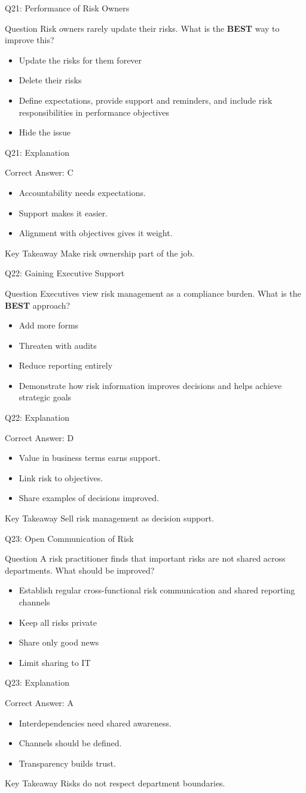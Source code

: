 \documentclass[aspectratio=169]{beamer}
\newcommand{\hq}[7]{%
	\begin{frame}{Q#1: #2}
		\begin{block}{Question}
			#3
		\end{block}
		\begin{itemize}
			#4
		\end{itemize}
	\end{frame}
	\begin{frame}{Q#1: Explanation}
		\begin{block}{Correct Answer: #5}
			\begin{itemize}
				#6
			\end{itemize}
		\end{block}
		\begin{alertblock}{Key Takeaway}
			#7
		\end{alertblock}
	\end{frame}
}
\begin{document}
	\hq{21}{Performance of Risk Owners}
	{Risk owners rarely update their risks. What is the \textbf{BEST} way to improve this?}
	{\item[\textbf{(A)}] Update the risks for them forever
		\item[\textbf{(B)}] Delete their risks
		\item[\textbf{(C)}] Define expectations, provide support and reminders, and include risk responsibilities in performance objectives
		\item[\textbf{(D)}] Hide the issue}
	{C}
	{\item Accountability needs expectations.
		\item Support makes it easier.
		\item Alignment with objectives gives it weight.}
	{Make risk ownership part of the job.}
	
	\hq{22}{Gaining Executive Support}
	{Executives view risk management as a compliance burden. What is the \textbf{BEST} approach?}
	{\item[\textbf{(A)}] Add more forms
		\item[\textbf{(B)}] Threaten with audits
		\item[\textbf{(C)}] Reduce reporting entirely
		\item[\textbf{(D)}] Demonstrate how risk information improves decisions and helps achieve strategic goals}
	{D}
	{\item Value in business terms earns support.
		\item Link risk to objectives.
		\item Share examples of decisions improved.}
	{Sell risk management as decision support.}
	
	\hq{23}{Open Communication of Risk}
	{A risk practitioner finds that important risks are not shared across departments. What should be improved?}
	{\item[\textbf{(A)}] Establish regular cross-functional risk communication and shared reporting channels
		\item[\textbf{(B)}] Keep all risks private
		\item[\textbf{(C)}] Share only good news
		\item[\textbf{(D)}] Limit sharing to IT}
	{A}
	{\item Interdependencies need shared awareness.
		\item Channels should be defined.
		\item Transparency builds trust.}
	{Risks do not respect department boundaries.}
	
\end{document}
